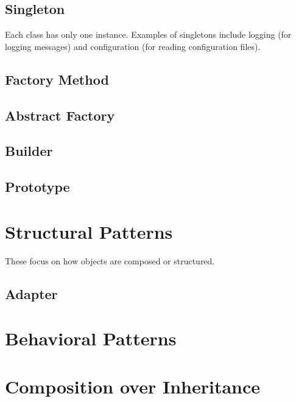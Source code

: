 \documentclass[oneside,11pt,dvipsnames]{book}
\begin{document}
\subsection{Singleton}
Each class has only one instance. Examples of singletons include logging (for logging messages) and configuration (for reading configuration files). 



\subsection{Factory Method}





\subsection{Abstract Factory}

\subsection{Builder}

\subsection{Prototype}

\section{Structural Patterns}
These focus on how objects are composed or structured.

\subsection{Adapter}


\section{Behavioral Patterns}

\section{Composition over Inheritance}

\end{document}
